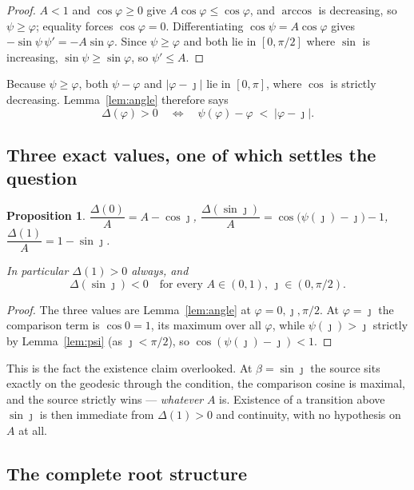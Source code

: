\documentclass[11pt]{article}
\newtheorem{proposition}{Proposition}
\theoremstyle{definition}
\theoremstyle{remark}
\begin{document}
\begin{proof}
$A<1$ and $\cos\varphi\ge0$ give $A\cos\varphi\le\cos\varphi$, and $\arccos$ is decreasing, so
$\psi\ge\varphi$; equality forces $\cos\varphi=0$. Differentiating
$\cos\psi=A\cos\varphi$ gives $-\sin\psi\,\psi'=-A\sin\varphi$. Since $\psi\ge\varphi$ and both
lie in $[0,\pi/2]$ where $\sin$ is increasing, $\sin\psi\ge\sin\varphi$, so $\psi'\le A$.
\end{proof}

Because $\psi\ge\varphi$, both $\psi-\varphi$ and $|\varphi-\jmath|$ lie in $[0,\pi]$, where
$\cos$ is strictly decreasing. Lemma~\ref{lem:angle} therefore says
\begin{equation}\label{eq:equiv}
\Delta(\varphi)>0\quad\Longleftrightarrow\quad \psi(\varphi)-\varphi\;<\;|\varphi-\jmath| .
\end{equation}

\subsection*{Three exact values, one of which settles the question}

\begin{proposition}\label{prop:values}
$\dfrac{\Delta(0)}{A}=A-\cos\jmath$, \quad
$\dfrac{\Delta(\sin\jmath)}{A}=\cos\!\big(\psi(\jmath)-\jmath\big)-1$, \quad
$\dfrac{\Delta(1)}{A}=1-\sin\jmath$.

In particular $\Delta(1)>0$ always, and
\[
\boxed{\;\Delta(\sin\jmath)<0\quad\text{for every }A\in(0,1),\ \jmath\in(0,\pi/2).\;}
\]
\end{proposition}

\begin{proof}
The three values are Lemma~\ref{lem:angle} at $\varphi=0,\jmath,\pi/2$. At $\varphi=\jmath$ the
comparison term is $\cos 0=1$, its maximum over all $\varphi$, while
$\psi(\jmath)>\jmath$ strictly by Lemma~\ref{lem:psi} (as $\jmath<\pi/2$), so
$\cos(\psi(\jmath)-\jmath)<1$.
\end{proof}

This is the fact the existence claim overlooked. At $\beta=\sin\jmath$ the source sits exactly on
the geodesic through the condition, the comparison cosine is maximal, and the source strictly
wins --- \emph{whatever} $A$ is. Existence of a transition above $\sin\jmath$ is then immediate
from $\Delta(1)>0$ and continuity, with no hypothesis on $A$ at all.

\subsection*{The complete root structure}
\end{document}

